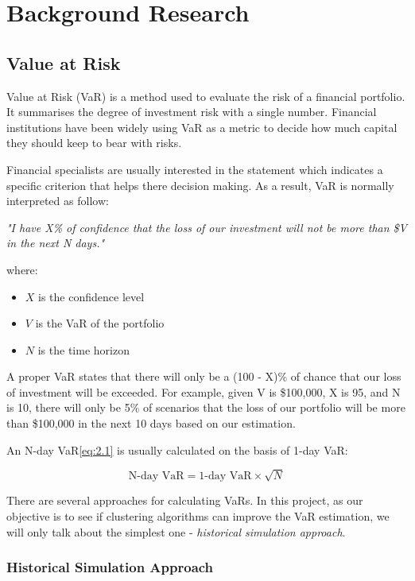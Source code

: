 \documentclass[11pt]{article} %
\theoremstyle{plain}
\theoremstyle{definition}
\begin{document}
\section{Background Research}
\subsection{Value at Risk}
Value at Risk (VaR) is a method used to evaluate the risk of a financial portfolio. It summarises the degree of investment risk with a single number. Financial institutions have been widely using VaR as a metric to decide how much capital they should keep to bear with risks.

Financial specialists are usually interested in the statement which indicates a specific criterion that helps there decision making. As a result, VaR is normally interpreted as follow:

\textsl{"I have X\% of confidence that the loss of our investment will not be more than \$V in the next N days."}

{
  \footnotesize
  where:
  \begin{itemize}[label=-, leftmargin=4em, itemsep=0.1em]
    \item ${X}$ is the confidence level
    \item ${V}$ is the VaR of the portfolio
    \item ${N}$ is the time horizon
  \end{itemize}
}

A proper VaR states that there will only be a (100 - X)\% of chance that our loss of investment will be exceeded. For example, given V is \$100,000, X is 95, and N is 10, there will only be 5\% of scenarios that the loss of our portfolio will be more than \$100,000 in the next 10 days based on our estimation.

An N-day VaR\eqref{eq:2.1} is usually calculated on the basis of 1-day VaR:

\begin{equation}
  \label{eq:2.1}
  \tag{2.1}
  {\text{N-day VaR} = \text{1-day VaR} \times \sqrt{N}}
\end{equation}

There are several approaches for calculating VaRs. In this project, as our objective is to see if clustering algorithms can improve the VaR estimation, we will only talk about the simplest one - \textsl{historical simulation approach}\cite{john/ofaod:2017}.

\subsubsection{Historical Simulation Approach}
\end{document}
